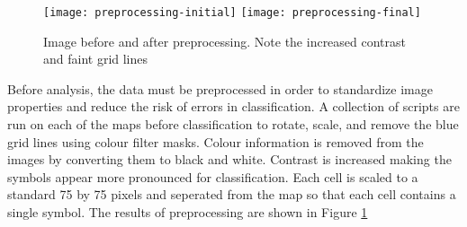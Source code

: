\begin{figure}[h]
    \begin{center}
    \texttt{[image: preprocessing-initial]}
    \texttt{[image: preprocessing-final]}
    \label{figure:preprocess}
    \caption{Image before and after preprocessing. Note the increased contrast and faint grid lines}
    \end{center}
\end{figure}

Before analysis, the data must be preprocessed in order to standardize image
properties and reduce the risk of errors in classification. A collection of
scripts are run on each of the maps before classification to rotate, scale, and
remove the blue grid lines using colour filter masks.  Colour information is
removed from the images by converting them to black and white. Contrast is
increased making the symbols appear more pronounced for classification. Each
cell is scaled to a standard 75 by 75 pixels and seperated from the map so that
each cell contains a single symbol.  The results of preprocessing are shown in
Figure \ref{figure:preprocess}

